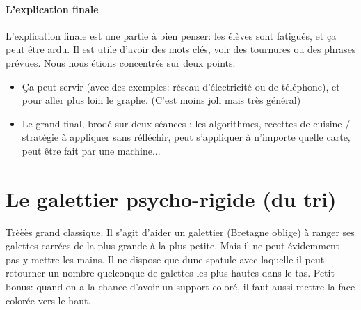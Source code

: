 \documentclass{article}
\begin{document}
 \paragraph{L'explication finale}
 L'explication finale est une partie à bien penser: les élèves sont fatigués, et
 ça peut être ardu. Il est utile d'avoir des mots clés, voir des tournures ou 
 des phrases prévues. Nous nous étions concentrés sur deux points:
 \begin{itemize}
 \item Ça peut servir (avec des exemples: réseau d'électricité ou de téléphone), 
 et pour aller plus loin le graphe. (C'est moins joli mais très général)
 \item Le grand final, brodé sur deux séances : les algorithmes, recettes de cuisine
 / stratégie à appliquer sans réfléchir, peut s'appliquer à n'importe quelle carte, 
 peut être fait par une machine... 
 \end{itemize}
 \section{Le galettier psycho-rigide (du tri)}
 Trèèès grand classique. Il s'agit d'aider un galettier (Bretagne oblige) à ranger
 ses galettes carrées de la plus grande à la plus petite. Mais il ne peut évidemment
 pas y mettre les mains. Il ne dispose que dune spatule avec laquelle il peut retourner
 un nombre quelconque de galettes les plus hautes dans le tas. Petit bonus: quand
 on a la chance d'avoir un support coloré, il faut aussi mettre la face colorée vers le haut.
 
\end{document}
